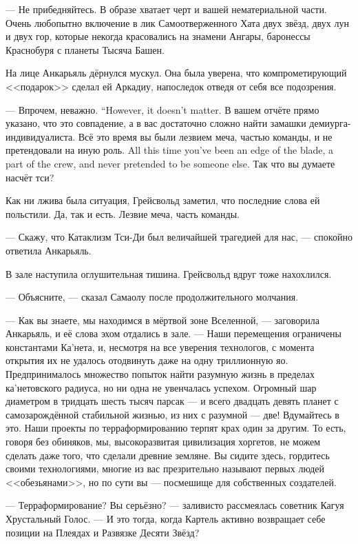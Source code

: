 --- Не прибедняйтесь.
В образе хватает черт и вашей нематериальной части.
Очень любопытно включение в лик Самоотверженного Хата двух звёзд, двух лун и двух гор, которые некогда красовались на знамени Ангары, баронессы Краснобуря с планеты Тысяча Башен.

На лице Анкарьяль дёрнулся мускул.
Она была уверена, что компрометирующий <<подарок>> сделал ей Аркадиу, напоследок отведя от себя все подозрения.

{--- Впрочем, неважно.}
{``However, it doesn't matter.}
В вашем отчёте прямо указано, что это совпадение, а в вас достаточно сложно найти замашки демиурга-индивидуалиста.
{Всё это время вы были лезвием меча, частью команды, и не претендовали на иную роль.}
{All this time you've been an edge of the blade, a part of the crew, and never pretended to be someone else.}
Так что вы думаете насчёт тси?

Как ни лжива была ситуация, Грейсвольд заметил, что последние слова ей польстили.
Да, так и есть.
Лезвие меча, часть команды.

--- Скажу, что Катаклизм Тси-Ди был величайшей трагедией для нас, --- спокойно ответила Анкарьяль.

В зале наступила оглушительная тишина.
Грейсвольд вдруг тоже нахохлился.

--- Объясните, --- сказал Самаолу после продолжительного молчания.

--- Как вы знаете, мы находимся в мёртвой зоне Вселенной, --- заговорила Анкарьяль, и её слова эхом отдались в зале.
--- Наши перемещения ограничены константами Ка'нета, и, несмотря на все уверения технологов, с момента открытия их не удалось отодвинуть даже на одну триллионную яо.
Предпринималось множество попыток найти разумную жизнь в пределах ка'нетовского радиуса, но ни одна не увенчалась успехом.
Огромный шар диаметром в тридцать шесть тысяч парсак --- и всего двадцать девять планет с самозарождённой стабильной жизнью, из них с разумной --- две!
Вдумайтесь в это.
Наши проекты по терраформированию терпят крах один за другим.
То есть, говоря без обиняков, мы, высокоразвитая цивилизация хоргетов, не можем сделать даже того, что сделали древние земляне.
Вы сидите здесь, гордитесь своими технологиями, многие из вас презрительно называют первых людей <<обезьянами>>, но по сути вы --- посмешище для собственных создателей.

--- Терраформирование?
Вы серьёзно? --- заливисто рассмеялась советник Кагуя Хрустальный Голос.
--- И это тогда, когда Картель активно возвращает себе позиции на Плеядах и Развязке Десяти Звёзд?

